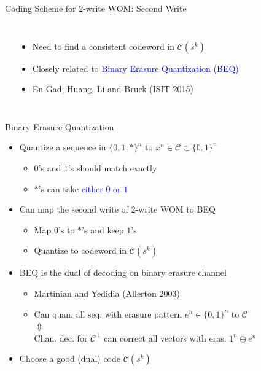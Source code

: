 \documentclass[10pt]{beamer}
\def\WOM_path{../compound-codes/WOM/slides/Figures}
\begin{document}
\begin{frame}{Coding Scheme for 2-write WOM: Second Write}
  \begin{center}
    \scalebox{0.5}{}    
  \end{center}
  \begin{columns}
    \begin{center}
      \scalebox{0.55}{}
    \end{center}
    \begin{itemize}
    \item Need to find a \alert{consistent} codeword in $\mathcal{C}(s^k)$
    \item<2-> Closely related to \textcolor{blue}{Binary Erasure Quantization (BEQ)}
    \item<2-> En Gad, Huang, Li and Bruck (ISIT 2015)
    \end{itemize}
  \end{columns}
\end{frame}

\begin{frame}{Binary Erasure Quantization}
  \begin{itemize}
  \item Quantize a sequence in $\{0,1,*\}^n$ to $x^n \in \mathcal{C} \subset \{0,1\}^n$
    \begin{itemize}
    \item $0$'s and $1$'s should \alert{match exactly}
    \item $*$'s can take \textcolor{blue}{either $0$ or $1$}
    \end{itemize}
    \vspace{0.25cm}
  \item Can map the second write of 2-write WOM to BEQ
    \begin{itemize}
    \item Map $0$'s to $*$'s and keep $1$'s
    \item Quantize to codeword in $\mathcal{C}(s^k)$
    \end{itemize}
\vspace{0.25cm}
  \item BEQ is the dual of decoding on binary erasure channel
    \begin{itemize}
    \item Martinian and Yedidia (Allerton 2003)
    \item Can quan. all seq. with erasure pattern $e^n \in \{0,1\}^n$ to $\mathcal{C}$ \\ \hspace{3.5cm} $\Updownarrow$ \\ Chan. dec. for $\mathcal{C}^{\perp}$ can correct all vectors with eras. $1^n \oplus e^n$
    \end{itemize}
    \vspace{0.25cm}
  \item Choose a good (dual) code $\mathcal{C}(s^k)$
  \end{itemize}
\end{frame}
\end{document}
